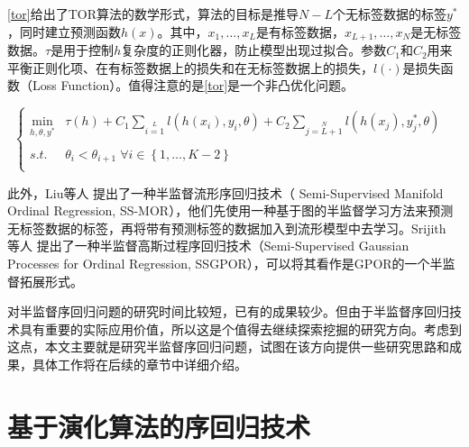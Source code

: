 \autoref{tor}给出了TOR算法的数学形式，算法的目标是推导\(N-L\)个无标签数据的标签\(y^{*}\)，同时建立预测函数\(h(x)\)。其中，\(x_{1},\dots,x_{L}\)是有标签数据，\(x_{L+1},\dots,x_{N}\)是无标签数据。\(\tau\)是用于控制\(h\)复杂度的正则化器，防止模型出现过拟合。参数\(C_{1}\)和\(C_{2}\)用来平衡正则化项、在有标签数据上的损失和在无标签数据上的损失，\(l(\cdot)\)是损失函数（Loss Function）。值得注意的是\autoref{tor}是一个非凸优化问题。


\begin{equation}
\label{tor}
\left\{\begin{array}{rll} \mathop{\min}\limits_{h,\theta,y^{*}} & \tau \left( h \right) + C_{1}\mathop{\sum}\limits_{i=1}\limits^{L} l \left( h(x_{i}),y_{i},\theta \right) + C_{2}\mathop{\sum}\limits_{j=L+1}\limits^{N} l \left( h(x_{j}),y_{j}^{*},\theta \right) & \\
\\
s.t. & \theta_{i} < \theta_{i+1} \; \forall i \in \left \{ 1,\dots,K-2 \right \} \\

\end{array}
\right.
\end{equation}


此外，Liu等人\citep{liu2011semi}
提出了一种半监督流形序回归技术（ Semi-Supervised Manifold Ordinal Regression, SS-MOR），他们先使用一种基于图的半监督学习方法来预测无标签数据的标签，再将带有预测标签的数据加入到流形模型中去学习。Srijith 等人\citep{srijith2013semi}
提出了一种半监督高斯过程序回归技术（Semi-Supervised Gaussian Processes for Ordinal Regression, SSGPOR），可以将其看作是GPOR\citep{chu2005gaussian}的一个半监督拓展形式。

对半监督序回归问题的研究时间比较短，已有的成果较少。但由于半监督序回归技术具有重要的实际应用价值，所以这是个值得去继续探索挖掘的研究方向。考虑到这点，本文主要就是研究半监督序回归问题，试图在该方向提供一些研究思路和成果，具体工作将在后续的章节中详细介绍。 

\section{基于演化算法的序回归技术}

